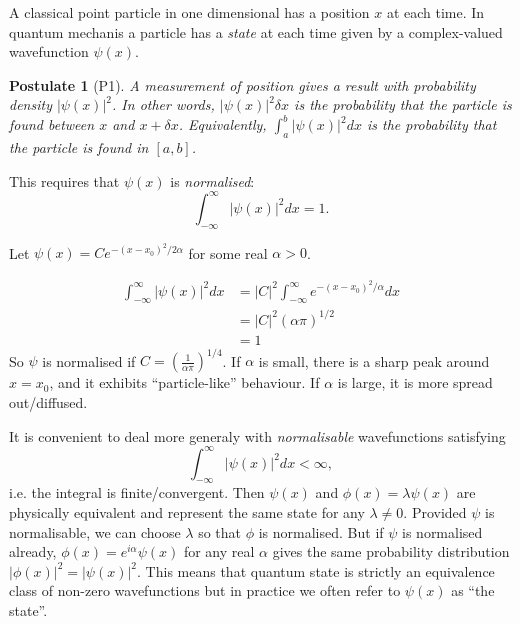 \documentclass[a4paper]{article}
\newtheorem*{postulate}{Postulate}
\begin{document}
A classical point particle in one dimensional has a position $x$ at each time. In quantum mechanis a particle has a \emph{state} at each time given by a complex-valued wavefunction $\psi(x)$.

\begin{postulate}[P1]
  \label{postulate:1}
  A measurement of position gives a result with probability density $|\psi(x)|^2$. In other words, $|\psi(x)|^2 \delta x$ is the probability that the particle is found between $x$ and $x+\delta x$. Equivalently, $\int_a^b |\psi(x)|^2 dx$ is the probability that the particle is found in $[a,b]$.
\end{postulate}

This requires that $\psi(x)$ is \emph{normalised}:
\[
  \int_{-\infty}^\infty |\psi(x)|^2 dx = 1.
\]

\begin{eg}
  Let $\psi(x) = C e^{-(x-x_0)^2/2\alpha}$ for some real $\alpha>0$.
  \begin{center}
  \end{center}
  \begin{align*}
    \int_{-\infty}^\infty |\psi(x)|^2 dx &= |C|^2 \int_{-\infty}^\infty e^{-(x-x_0)^2/\alpha} dx \\
    &= |C|^2 (\alpha\pi)^{1/2} \\
    &= 1
  \end{align*}
  So $\psi$ is normalised if $C=(\frac{1}{\alpha\pi})^{1/4}$. If $\alpha$ is small, there is a sharp peak around $x=x_0$, and it exhibits ``particle-like'' behaviour. If $\alpha$ is large, it is more spread out/diffused.
\end{eg}

It is convenient to deal more generaly with \emph{normalisable} wavefunctions satisfying
\[
  \int_{-\infty}^\infty |\psi(x)|^2 dx < \infty,
\]
i.e. the integral is finite/convergent. Then $\psi(x)$ and $\phi(x) = \lambda\psi(x)$ are physically equivalent and represent the same state for any $\lambda\neq0$. Provided $\psi$ is normalisable, we can choose $\lambda$ so that $\phi$ is normalised. But if $\psi$ is normalised already, $\phi(x) = e^{i\alpha}\psi(x)$ for any real $\alpha$ gives the same probability distribution $|\phi(x)|^2 = |\psi(x)|^2$. This means that quantum state is strictly an equivalence class of non-zero wavefunctions but in practice we often refer to $\psi(x)$ as ``the state''.
\end{document}
